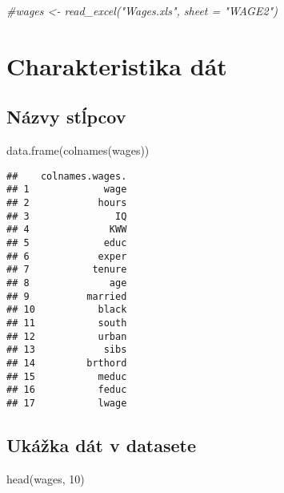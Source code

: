 \documentclass[
]{article}
\newenvironment{Shaded}{\begin{snugshade}}{\end{snugshade}}
\newcommand{\CommentTok}[1]{\textcolor[rgb]{0.56,0.35,0.01}{\textit{#1}}}
\newcommand{\DecValTok}[1]{\textcolor[rgb]{0.00,0.00,0.81}{#1}}
\newcommand{\FunctionTok}[1]{\textcolor[rgb]{0.00,0.00,0.00}{#1}}
\newcommand{\NormalTok}[1]{#1}
\begin{document}
\begin{Shaded}
\begin{Highlighting}[]
\CommentTok{\#wages \textless{}{-} read\_excel("Wages.xls", sheet = "WAGE2")}
\end{Highlighting}
\end{Shaded}

\hypertarget{charakteristika-duxe1t}{%
\section{Charakteristika dát}\label{charakteristika-duxe1t}}

\hypertarget{nuxe1zvy-stux13apcov}{%
\subsection{Názvy stĺpcov}\label{nuxe1zvy-stux13apcov}}

\begin{Shaded}
\begin{Highlighting}[]
\FunctionTok{data.frame}\NormalTok{(}\FunctionTok{colnames}\NormalTok{(wages))}
\end{Highlighting}
\end{Shaded}

\begin{verbatim}
##    colnames.wages.
## 1             wage
## 2            hours
## 3               IQ
## 4              KWW
## 5             educ
## 6            exper
## 7           tenure
## 8              age
## 9          married
## 10           black
## 11           south
## 12           urban
## 13            sibs
## 14         brthord
## 15           meduc
## 16           feduc
## 17           lwage
\end{verbatim}

\hypertarget{ukuxe1ux17eka-duxe1t-v-datasete}{%
\subsection{Ukážka dát v
datasete}\label{ukuxe1ux17eka-duxe1t-v-datasete}}

\begin{Shaded}
\begin{Highlighting}[]
\FunctionTok{head}\NormalTok{(wages, }\DecValTok{10}\NormalTok{)}
\end{Highlighting}
\end{Shaded}
\end{document}
